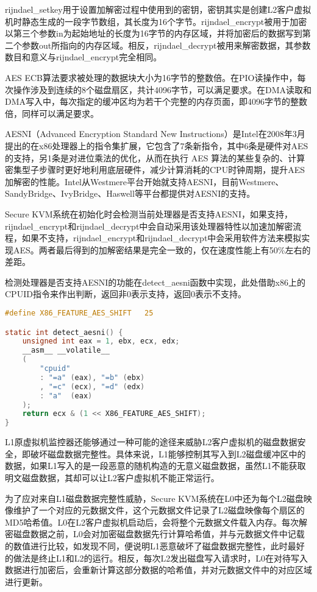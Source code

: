 rijndael\_setkey用于设置加解密过程中使用到的密钥，密钥其实是创建L2客户虚拟机时静态生成的一段字节数组，其长度为16个字节。rijndael\_encrypt被用于加密以第三个参数in为起始地址的长度为16字节的内存区域，并将加密后的数据写到第二个参数out所指向的内存区域。相反，rijndael\_decrypt被用来解密数据，其参数数目和意义与rijndael\_encrypt完全相同。

AES ECB算法要求被处理的数据块大小为16字节的整数倍。在PIO读操作中，每次操作涉及到连续的8个磁盘扇区，共计4096字节，可以满足要求。在DMA读取和DMA写入中，每次指定的缓冲区均为若干个完整的内存页面，即4096字节的整数倍，同样可以满足要求。

AESNI（Advanced Encryption Standard New Instructions）是Intel在2008年3月提出的在x86处理器上的指令集扩展，它包含了7条新指令，其中6条是硬件对AES的支持，另1条是对进位乘法的优化，从而在执行 AES 算法的某些复杂的、计算密集型子步骤时更好地利用底层硬件，减少计算消耗的CPU时钟周期，提升AES加解密的性能。Intel从Westmere平台开始就支持AESNI，目前Westmere、SandyBridge、IvyBridge、Haswell等平台都提供对AESNI的支持。

Secure KVM系统在初始化时会检测当前处理器是否支持AESNI，如果支持，rijndael\_encrypt和rijndael\_decrypt中会自动采用该处理器特性以加速加解密流程，如果不支持，rijndael\_encrypt和rijndael\_decrypt中会采用软件方法来模拟实现AES。两者最后得到的加解密结果是完全一致的，仅在速度性能上有50\%左右的差距。

检测处理器是否支持AESNI的功能在detect\_aesni函数中实现，此处借助x86上的CPUID指令来作出判断，返回非0表示支持，返回0表示不支持。

\begin{lstlisting}[language={C}, caption={detect\_aesni实现源代码}]
#define X86_FEATURE_AES_SHIFT	25

static int detect_aesni() {
	unsigned int eax = 1, ebx, ecx, edx;
	__asm__ __volatile__
    (
        "cpuid"
        : "=a" (eax), "=b" (ebx)
        , "=c" (ecx), "=d" (edx)
        : "a"  (eax)
    );
    return ecx & (1 << X86_FEATURE_AES_SHIFT);
}
\end{lstlisting}

L1原虚拟机监控器还能够通过一种可能的途径来威胁L2客户虚拟机的磁盘数据安全，即破坏磁盘数据完整性。具体来说，L1能够控制其写入到L2磁盘缓冲区中的数据，如果L1写入的是一段恶意的随机构造的无意义磁盘数据，虽然L1不能获取明文磁盘数据，其却可以让L2客户虚拟机不能正常运行。

为了应对来自L1磁盘数据完整性威胁，Secure KVM系统在L0中还为每个L2磁盘映像维护了一个对应的元数据文件，这个元数据文件记录了L2磁盘映像每个扇区的MD5哈希值。L0在L2客户虚拟机启动后，会将整个元数据文件载入内存。每次解密磁盘数据之前，L0会对加密磁盘数据先行计算哈希值，并与元数据文件中记载的数值进行比较，如发现不同，便说明L1恶意破坏了磁盘数据完整性，此时最好的做法是终止L1和L2的运行。相反，每次L2发出磁盘写入请求时，L0在对待写入数据进行加密后，会重新计算这部分数据的哈希值，并对元数据文件中的对应区域进行更新。

